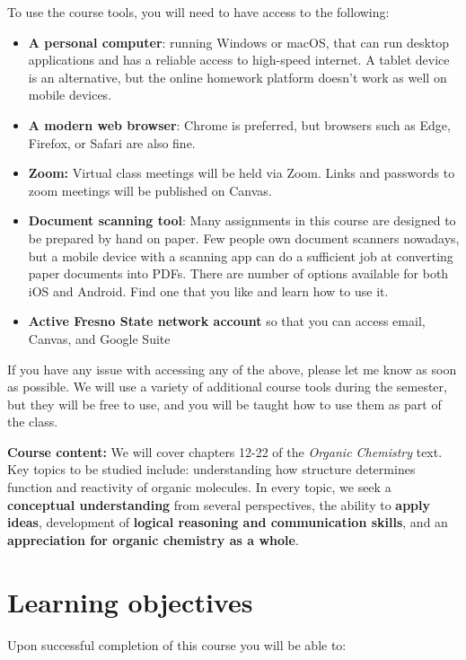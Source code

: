 To use the course tools, you will need to have access to the following:

\begin{itemize}
\tightlist
\item
  \textbf{A personal computer}: running Windows or macOS, that can run
  desktop applications and has a reliable access to high-speed internet.
  A tablet device is an alternative, but the online homework platform
  doesn't work as well on mobile devices.
\item
  \textbf{A modern web browser}: Chrome is preferred, but browsers such
  as Edge, Firefox, or Safari are also fine.
\item
  \textbf{Zoom:} Virtual class meetings will be held via Zoom. Links and
  passwords to zoom meetings will be published on Canvas.
\item
  \textbf{Document scanning tool}: Many assignments in this course are
  designed to be prepared by hand on paper. Few people own document
  scanners nowadays, but a mobile device with a scanning app can do a
  sufficient job at converting paper documents into PDFs. There are
  number of options available for both iOS and Android. Find one that
  you like and learn how to use it.
\item
  \textbf{Active Fresno State network account} so that you can access
  email, Canvas, and Google Suite
\end{itemize}

If you have any issue with accessing any of the above, please let me
know as soon as possible. We will use a variety of additional course
tools during the semester, but they will be free to use, and you will be
taught how to use them as part of the class.

\textbf{Course content:} We will cover chapters 12-22 of the
\emph{Organic Chemistry} text. Key topics to be studied include:
understanding how structure determines function and reactivity of
organic molecules. In every topic, we seek a \textbf{conceptual
understanding} from several perspectives, the ability to \textbf{apply
ideas}, development of \textbf{logical reasoning and communication
skills}, and an \textbf{appreciation for organic chemistry as a whole}.

\hypertarget{learning-objectives}{%
\section{Learning objectives}\label{learning-objectives}}

Upon successful completion of this course you will be able to:


